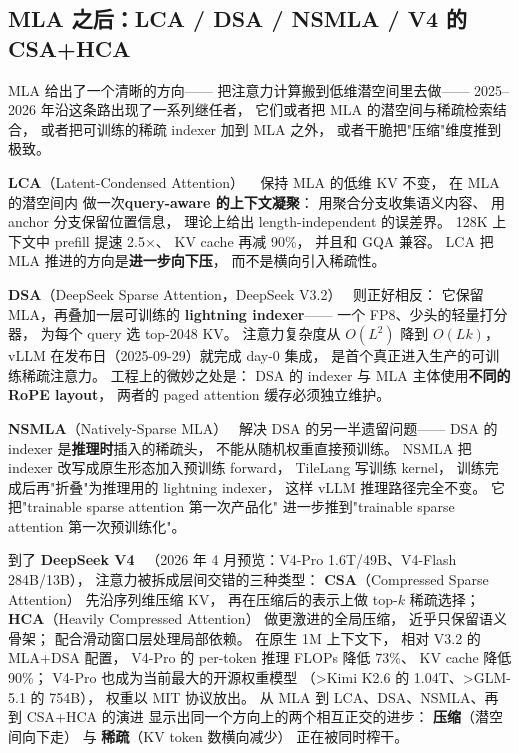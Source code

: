 \subsection{MLA 之后：LCA / DSA / NSMLA / V4 的 CSA+HCA}

MLA 给出了一个清晰的方向——
把注意力计算搬到低维潜空间里去做——
2025--2026 年沿这条路出现了一系列继任者，
它们或者把 MLA 的潜空间与稀疏检索结合，
或者把可训练的稀疏 indexer 加到 MLA 之外，
或者干脆把"压缩"维度推到极致。

\textbf{LCA}（Latent-Condensed Attention）
~\cite{lca2026}
保持 MLA 的低维 KV 不变，
在 MLA 的潜空间内
做一次\textbf{query-aware 的上下文凝聚}：
用聚合分支收集语义内容、
用 anchor 分支保留位置信息，
理论上给出 length-independent 的误差界。
128K 上下文中 prefill 提速 2.5$\times$、
KV cache 再减 90\%，
并且和 GQA 兼容。
LCA 把 MLA 推进的方向是\textbf{进一步向下压}，
而不是横向引入稀疏性。

\textbf{DSA}（DeepSeek Sparse Attention，DeepSeek V3.2）~\cite{dsa2025}
则正好相反：
它保留 MLA，再叠加一层可训练的
\textbf{lightning indexer}——
一个 FP8、少头的轻量打分器，
为每个 query 选 top-2048 KV。
注意力复杂度从 $O(L^2)$ 降到 $O(Lk)$，
vLLM 在发布日（2025-09-29）就完成 day-0 集成，
是首个真正进入生产的可训练稀疏注意力。
工程上的微妙之处是：
DSA 的 indexer 与 MLA 主体使用\textbf{不同的 RoPE layout}，
两者的 paged attention 缓存必须独立维护。

\textbf{NSMLA}（Natively-Sparse MLA）~\cite{nsmla2026}
解决 DSA 的另一半遗留问题——
DSA 的 indexer 是\textbf{推理时}插入的稀疏头，
不能从随机权重直接预训练。
NSMLA 把 indexer 改写成原生形态加入预训练 forward，
TileLang 写训练 kernel，
训练完成后再"折叠"为推理用的 lightning indexer，
这样 vLLM 推理路径完全不变。
它把"trainable sparse attention 第一次产品化"
进一步推到"trainable sparse attention 第一次预训练化"。

到了 \textbf{DeepSeek V4}~\cite{deepseekv4preview2026}
（2026 年 4 月预览：V4-Pro 1.6T/49B、V4-Flash 284B/13B），
注意力被拆成层间交错的三种类型：
\textbf{CSA}（Compressed Sparse Attention）
先沿序列维压缩 KV，
再在压缩后的表示上做 top-$k$ 稀疏选择；
\textbf{HCA}（Heavily Compressed Attention）
做更激进的全局压缩，
近乎只保留语义骨架；
配合滑动窗口层处理局部依赖。
在原生 1M 上下文下，
相对 V3.2 的 MLA+DSA 配置，
V4-Pro 的 per-token 推理 FLOPs 降低 73\%、
KV cache 降低 90\%；
V4-Pro 也成为当前最大的开源权重模型
（>Kimi K2.6 的 1.04T、>GLM-5.1 的 754B），
权重以 MIT 协议放出。
从 MLA 到 LCA、DSA、NSMLA、再到 CSA+HCA 的演进
显示出同一个方向上的两个相互正交的进步：
\textbf{压缩}（潜空间向下走）
与 \textbf{稀疏}（KV token 数横向减少）
正在被同时榨干。

